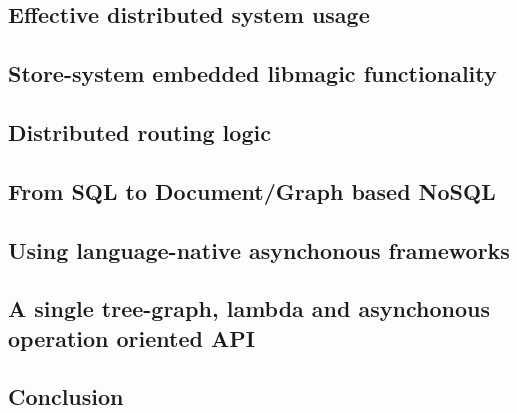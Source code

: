 \subsection{Effective distributed system usage}
\subsection{Store-system embedded libmagic functionality}
\subsection{Distributed routing logic}
\subsection{From SQL to Document/Graph based NoSQL}
\subsection{Using language-native asynchonous frameworks}
\subsection{A single tree-graph, lambda and asynchonous operation oriented API}
\subsection{Conclusion}
